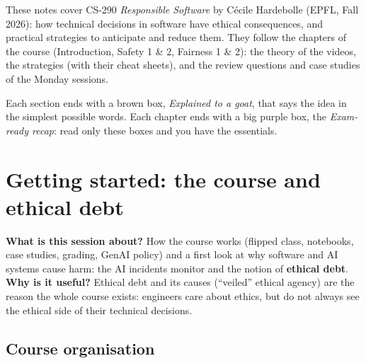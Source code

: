 \documentclass[11pt,a4paper,openany]{book}
\begin{document}
\raggedbottom


\tableofcontents
\clearpage

These notes cover CS-290 \emph{Responsible Software} by C\'ecile Hardebolle (EPFL, Fall 2026):
how technical decisions in software have ethical consequences, and practical strategies to
anticipate and reduce them. They follow the chapters of the course (Introduction, Safety 1 \& 2,
Fairness 1 \& 2): the theory of the videos, the strategies (with their cheat sheets), and the
review questions and case studies of the Monday sessions.

Each section ends with a brown box, \emph{Explained to a goat}, that says the idea in the
simplest possible words. Each chapter ends with a big purple box, the \emph{Exam-ready recap}:
read only these boxes and you have the essentials.


\chapter{Getting started: the course and ethical debt}

\begin{rembox}[title={In a nutshell}]
\textbf{What is this session about?} How the course works (flipped class, notebooks, case
studies, grading, GenAI policy) and a first look at why software and AI systems cause harm:
the AI incidents monitor and the notion of \textbf{ethical debt}. \\
\textbf{Why is it useful?} Ethical debt and its causes (``veiled'' ethical agency) are the
reason the whole course exists: engineers care about ethics, but do not always see the ethical
side of their technical decisions.
\end{rembox}


\section{Course organisation}
\end{document}
